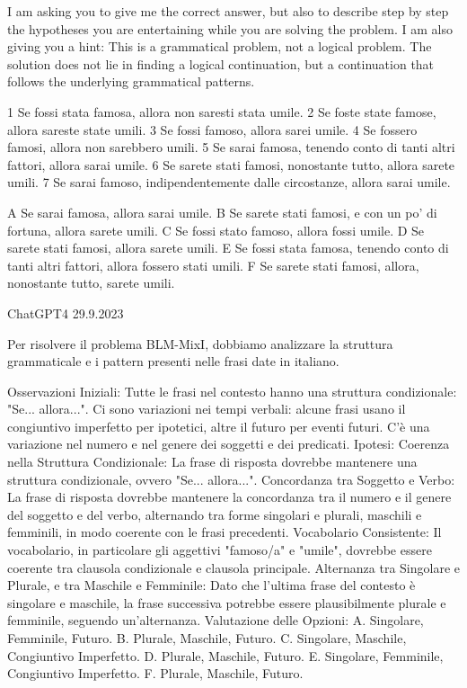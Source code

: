 I am asking you to give me the correct answer, but also to describe step by step  the hypotheses you are entertaining while you are solving the problem.
I am also giving you a hint: This is a grammatical problem, not a logical problem. The solution does not lie in finding a logical continuation, but a continuation that follows the underlying grammatical patterns.

1 Se fossi stata famosa, allora non saresti stata umile.
2 Se foste state famose, allora sareste state umili.
3 Se fossi famoso, allora sarei umile.
4 Se fossero famosi, allora non sarebbero umili.
5 Se sarai famosa, tenendo conto di tanti altri fattori, allora sarai umile.
6 Se sarete stati famosi, nonostante tutto, allora sarete umili.
7 Se sarai famoso, indipendentemente dalle circostanze, allora sarai umile.

A Se sarai famosa, allora sarai umile.
B Se sarete stati famosi, e con un po' di fortuna, allora sarete umili.
C Se fossi stato famoso, allora fossi umile.
D Se sarete stati famosi, allora sarete umili.
E Se fossi stata famosa, tenendo conto di tanti altri fattori, allora fossero stati umili.
F Se sarete stati famosi, allora, nonostante tutto, sarete umili.

ChatGPT4 29.9.2023

Per risolvere il problema BLM-MixI, dobbiamo analizzare la struttura grammaticale e i pattern presenti nelle frasi date in italiano.

Osservazioni Iniziali:
Tutte le frasi nel contesto hanno una struttura condizionale: "Se... allora...".
Ci sono variazioni nei tempi verbali: alcune frasi usano il congiuntivo imperfetto per ipotetici, altre il futuro per eventi futuri.
C'è una variazione nel numero e nel genere dei soggetti e dei predicati.
Ipotesi:
Coerenza nella Struttura Condizionale: La frase di risposta dovrebbe mantenere una struttura condizionale, ovvero "Se... allora...".
Concordanza tra Soggetto e Verbo: La frase di risposta dovrebbe mantenere la concordanza tra il numero e il genere del soggetto e del verbo, alternando tra forme singolari e plurali, maschili e femminili, in modo coerente con le frasi precedenti.
Vocabolario Consistente: Il vocabolario, in particolare gli aggettivi "famoso/a" e "umile", dovrebbe essere coerente tra clausola condizionale e clausola principale.
Alternanza tra Singolare e Plurale, e tra Maschile e Femminile: Dato che l'ultima frase del contesto è singolare e maschile, la frase successiva potrebbe essere plausibilmente plurale e femminile, seguendo un’alternanza.
Valutazione delle Opzioni:
A. Singolare, Femminile, Futuro.
B. Plurale, Maschile, Futuro.
C. Singolare, Maschile, Congiuntivo Imperfetto.
D. Plurale, Maschile, Futuro.
E. Singolare, Femminile, Congiuntivo Imperfetto.
F. Plurale, Maschile, Futuro.

